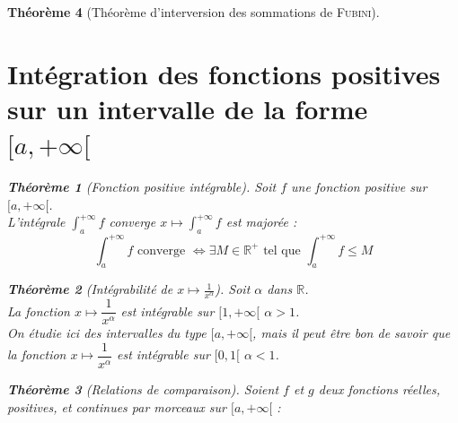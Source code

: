 \documentclass[11pt,a4paper]{report}
\newtheorem{theorem}{Théorème}[chapter]
\newtheorem{itheorem}[theorem]{Théorème}
\theoremstyle{definition}
\begin{document}
\begin{theorem}[Théorème d'interversion des sommations de \textsc{Fubini}]
\section{Intégration des fonctions positives sur un intervalle de la forme $[a,+\infty[$} %
\label{sec:integration_fonction_positives}
\begin{itheorem}[Fonction positive intégrable]
    \label{thm:fonction_positive_integrable}
     Soit $f$ une fonction positive sur $[a,+\infty [$.\\
     L'intégrale $\int_a^{+\infty} f$ converge \Longleftrightarrow $x \longmapsto \int_a^{+\infty} f$ est majorée : 
     \begin{equation}
     \int_a^{+\infty} f\text{ converge }\Longleftrightarrow \exists M\in \ensuremath{\mathbb{R}}^+\text{ tel que }\int_a^{+\infty} f \le M
     \end{equation}
\end{itheorem}
\begin{itheorem}[Intégrabilité de $x \mapsto \frac{1}{x^\alpha}$]
\label{thm:integrale_riemann}
     Soit $\alpha$ dans \ensuremath{\mathbb{R}}.\\
     La fonction $x \longmapsto \dfrac{1}{x^\alpha}$ est intégrable sur $[1,+\infty [$ \Longleftrightarrow $\alpha > 1$.\\[1.3\baselineskip] 
     On étudie ici des intervalles du type $[a,+\infty [$, mais il peut être bon de savoir que la fonction $x \longmapsto \dfrac{1}{x^\alpha}$ est intégrable sur $[0,1 [$ \Longleftrightarrow $\alpha < 1$.
\end{itheorem}
\begin{itheorem}[Relations de comparaison]
    \label{thm:relations_de_comparaison_fonction_positive}
     Soient $f$ et $g$ deux fonctions \emph{réelles}, \emph{positives}, et \emph{continues par morceaux} sur $[a,+\infty [$ : 

\end{itheorem}
\end{theorem}
\end{document}
